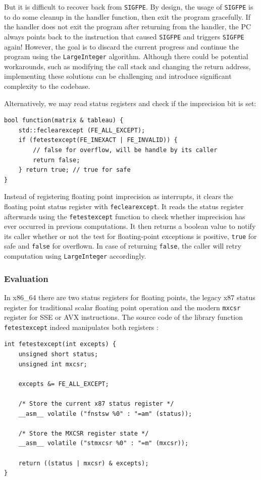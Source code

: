 \documentclass[logo,bsc,singlespacing,parskip]{infthesis}
\newcommand{\sigfpe}{\texttt{SIGFPE}}
\newcommand{\mxcsr}{\texttt{mxcsr}}
\begin{document}
But it is difficult to recover back from \sigfpe{}. By design, the usage
of \sigfpe{} is to do some cleanup in the handler function, then exit the program
gracefully. If the handler does not exit the program after returning from the
handler, the PC always points back to the instruction that caused \sigfpe{} and
triggers \sigfpe{} again! However, the goal is to discard the current progress and
continue the program using the \texttt{LargeInteger}  algorithm. Although there could
be potential workarounds, such as modifying the call stack and changing the
return address, implementing these solutions can be challenging and
introduce significant complexity to the codebase.

Alternatively, we may read status registers and check if the imprecision bit is
set: 
\begin{verbatim}
bool function(matrix & tableau) {
    std::feclearexcept (FE_ALL_EXCEPT);
    if (fetestexcept(FE_INEXACT | FE_INVALID)) {
        // false for overflow, will be handle by its caller
        return false; 
    } return true; // true for safe
}
\end{verbatim}

Instead of registering floating point imprecision as interrupts, it clears the
floating point status register with \texttt{feclearexcept}. It reads the status
register afterwards using the \texttt{fetestexcept} function to check whether
imprecision has ever occurred in previous computations. It then returns a
boolean value to notify its caller whether or not the test for floating-point
exceptions is positive, \texttt{true} for safe and \texttt{false} for overflown.
In case of returning \texttt{false}, the caller will retry computation using
\texttt{LargeInteger} accordingly. 



\subsubsection{Evaluation}
In x86\_64 there are two status registers for floating points, the legacy x87
status register for traditional scalar floating point operation and the modern
\mxcsr{} register for SSE or AVX instructions. The source code
of the library function \texttt{fetestexcept} indeed manipulates both registers
\cite{fenvlib}: 
\begin{verbatim}
int fetestexcept(int excepts) {
    unsigned short status;
    unsigned int mxcsr;

    excepts &= FE_ALL_EXCEPT;

    /* Store the current x87 status register */
    __asm__ volatile ("fnstsw %0" : "=am" (status));

    /* Store the MXCSR register state */
    __asm__ volatile ("stmxcsr %0" : "=m" (mxcsr));

    return ((status | mxcsr) & excepts);
}
\end{verbatim}
\end{document}
